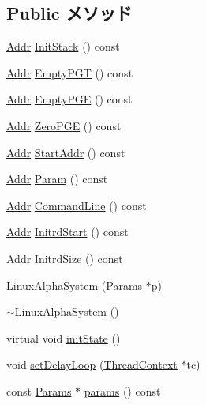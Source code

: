 \subsection*{Public メソッド}
\begin{DoxyCompactItemize}
\item 
\hyperlink{base_2types_8hh_af1bb03d6a4ee096394a6749f0a169232}{Addr} \hyperlink{classLinuxAlphaSystem_a469a89bdc63563c0bc5846ef647dcab6}{InitStack} () const 
\item 
\hyperlink{base_2types_8hh_af1bb03d6a4ee096394a6749f0a169232}{Addr} \hyperlink{classLinuxAlphaSystem_a2259d56c0c0084560828cefba4f46c0a}{EmptyPGT} () const 
\item 
\hyperlink{base_2types_8hh_af1bb03d6a4ee096394a6749f0a169232}{Addr} \hyperlink{classLinuxAlphaSystem_afd9b1bf6ab7fce16a7fb5fbee207c7fb}{EmptyPGE} () const 
\item 
\hyperlink{base_2types_8hh_af1bb03d6a4ee096394a6749f0a169232}{Addr} \hyperlink{classLinuxAlphaSystem_a9a4b640fd69f54b236dfe826a83e99ad}{ZeroPGE} () const 
\item 
\hyperlink{base_2types_8hh_af1bb03d6a4ee096394a6749f0a169232}{Addr} \hyperlink{classLinuxAlphaSystem_a0cec91dcd0a14397dacd2e083f248ac8}{StartAddr} () const 
\item 
\hyperlink{base_2types_8hh_af1bb03d6a4ee096394a6749f0a169232}{Addr} \hyperlink{classLinuxAlphaSystem_a0df930196034a157336cf5c0b8c62619}{Param} () const 
\item 
\hyperlink{base_2types_8hh_af1bb03d6a4ee096394a6749f0a169232}{Addr} \hyperlink{classLinuxAlphaSystem_abcf63fc8eb1c5516fa32ca30a8fa11de}{CommandLine} () const 
\item 
\hyperlink{base_2types_8hh_af1bb03d6a4ee096394a6749f0a169232}{Addr} \hyperlink{classLinuxAlphaSystem_abca06263004752bd3ae5595b19a0c288}{InitrdStart} () const 
\item 
\hyperlink{base_2types_8hh_af1bb03d6a4ee096394a6749f0a169232}{Addr} \hyperlink{classLinuxAlphaSystem_a257cf57c2cc6d9965f9adf8e062d5b74}{InitrdSize} () const 
\item 
\hyperlink{classLinuxAlphaSystem_a24f1bfc0f81c6de9ba2424a337ba7144}{LinuxAlphaSystem} (\hyperlink{classLinuxAlphaSystem_a0d8e2379ed014b6039c45eb98c24fed4}{Params} $\ast$p)
\item 
\hyperlink{classLinuxAlphaSystem_a09db0385b0436f3fb000069afd5d1032}{$\sim$LinuxAlphaSystem} ()
\item 
virtual void \hyperlink{classLinuxAlphaSystem_a3c34ea9b29f410748d4435a667484924}{initState} ()
\item 
void \hyperlink{classLinuxAlphaSystem_a137cc9484ecf0bcc374fb7031b48d566}{setDelayLoop} (\hyperlink{classThreadContext}{ThreadContext} $\ast$tc)
\item 
const \hyperlink{classLinuxAlphaSystem_a0d8e2379ed014b6039c45eb98c24fed4}{Params} $\ast$ \hyperlink{classLinuxAlphaSystem_acd3c3feb78ae7a8f88fe0f110a718dff}{params} () const 
\end{DoxyCompactItemize}
